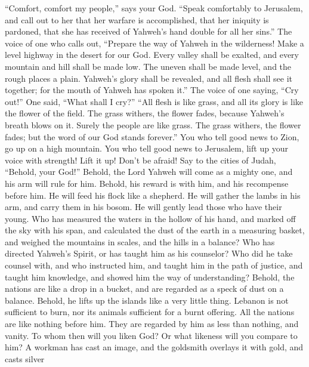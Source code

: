  ``Comfort, comfort my people,'' says your God. 
``Speak comfortably to Jerusalem, and call out to her that her warfare
is accomplished, that her iniquity is pardoned, that she has received of
Yahweh's hand double for all her sins.''  The voice of one
who calls out, ``Prepare the way of Yahweh in the wilderness! Make a
level highway in the desert for our God.  Every valley shall
be exalted, and every mountain and hill shall be made low. The uneven
shall be made level, and the rough places a plain.  Yahweh's
glory shall be revealed, and all flesh shall see it together; for the
mouth of Yahweh has spoken it.''  The voice of one saying,
``Cry out!'' One said, ``What shall I cry?'' ``All flesh is like grass,
and all its glory is like the flower of the field.  The
grass withers, the flower fades, because Yahweh's breath blows on it.
Surely the people are like grass.  The grass withers, the
flower fades; but the word of our God stands forever.''  You
who tell good news to Zion, go up on a high mountain. You who tell good
news to Jerusalem, lift up your voice with strength! Lift it up! Don't
be afraid! Say to the cities of Judah, ``Behold, your God!''
 Behold, the Lord Yahweh will come as a mighty one, and his
arm will rule for him. Behold, his reward is with him, and his
recompense before him.  He will feed his flock like a
shepherd. He will gather the lambs in his arm, and carry them in his
bosom. He will gently lead those who have their young.  Who
has measured the waters in the hollow of his hand, and marked off the
sky with his span, and calculated the dust of the earth in a measuring
basket, and weighed the mountains in scales, and the hills in a balance?
 Who has directed Yahweh's Spirit, or has taught him as his
counselor?  Who did he take counsel with, and who
instructed him, and taught him in the path of justice, and taught him
knowledge, and showed him the way of understanding? 
Behold, the nations are like a drop in a bucket, and are regarded as a
speck of dust on a balance. Behold, he lifts up the islands like a very
little thing.  Lebanon is not sufficient to burn, nor its
animals sufficient for a burnt offering.  All the nations
are like nothing before him. They are regarded by him as less than
nothing, and vanity.  To whom then will you liken God? Or
what likeness will you compare to him?  A workman has cast
an image, and the goldsmith overlays it with gold, and casts silver
